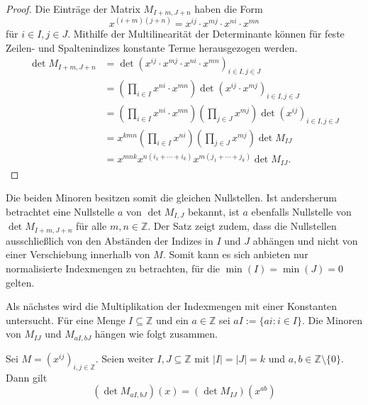 \begin{proof}
    Die Einträge der Matrix $M_{I+m,J+n}$ haben die Form 
    \begin{equation*}
        x^{(i+m)(j+n)} = x^{ij} \cdot x^{mj} \cdot x^{ni} \cdot x^{mn} 
    \end{equation*} für $i\in I, j\in J$. Mithilfe der Multilinearität der Determinante können für feste Zeilen- und Spaltenindizes konstante Terme herausgezogen werden.
    \begin{align*}
        \det M_{I+m,J+n}    &= \det \left(x^{ij} \cdot x^{mj} \cdot x^{ni} \cdot x^{mn} \right)_{i\in I,j\in J} \\ 
                            &= \left( \prod_{i \in I} x^{ni} \cdot x^{mn}\right) \det \left(x^{ij} \cdot x^{mj} \right)_{i\in I,j\in J} \\ 
                            &= \left( \prod_{i \in I} x^{ni} \cdot x^{mn}\right) \left( \prod_{j \in J} x^{mj}\right) \det \left(x^{ij}\right)_{i\in I,j\in J} \\ 
                            &= x^{kmn} \left( \prod_{i \in I} x^{ni}\right) \left( \prod_{j \in J} x^{mj}\right) \det M_{IJ} \\ 
                            &= x^{mnk} x^{n(i_1 +\cdots +i_k)} x^{m(j_1+\cdots +j_k)} \det M_{IJ}.
    \end{align*}
\end{proof}

Die beiden Minoren besitzen somit die gleichen Nullstellen. Ist andersherum betrachtet eine Nullstelle $a$ von $\det M_{I,J}$ bekannt, ist $a$ ebenfalls Nullstelle von $\det M_{I+m,J+n}$ für alle $m,n \in \mathbb{Z}$. Der Satz zeigt zudem, dass die Nullstellen ausschließlich von den Abständen der Indizes in $I$ und $J$ abhängen und nicht von einer Verschiebung innerhalb von $M$. Somit kann es sich anbieten nur normalisierte Indexmengen zu betrachten, für die $\min(I) = \min(J) = 0$ gelten.

Als nächstes wird die Multiplikation der Indexmengen mit einer Konstanten untersucht. Für eine Menge $I \subseteq \mathbb{Z}$ und ein $a \in \mathbb{Z}$ sei $aI := \{ai:i\in I\}$. Die Minoren von $M_{IJ}$ und $M_{aI,bJ}$ hängen wie folgt zusammen.

\begin{satz} \label{satz:skalierung}
    Sei $M = \left( x^{ij} \right)_{i,j \in \mathbb{Z}}$. Seien weiter $I,J \subseteq \mathbb{Z}$ mit $|I|=|J|=k$ und $a,b \in \mathbb{Z}\setminus\{0\}$. Dann gilt
    \begin{equation*}
        \left( \det{} M_{aI,bJ} \right) (x) = \left( \det{} M_{IJ} \right) (x^{ab})
    \end{equation*}
\end{satz}

